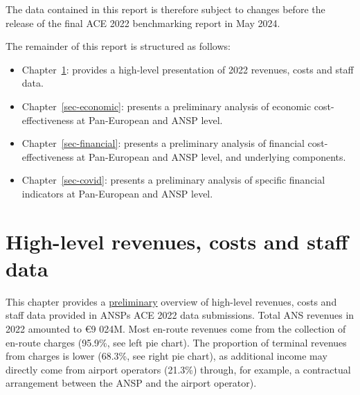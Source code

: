 \documentclass[
  letterpaper,
  DIV=11,
  numbers=noendperiod]{scrreprt}
\providecommand{\tightlist}{%
  \setlength{\itemsep}{0pt}\setlength{\parskip}{0pt}}\usepackage{longtable,booktabs,array}
\begin{document}
The data contained in this report is therefore subject to changes before
the release of the final ACE 2022 benchmarking report in May 2024.

The remainder of this report is structured as follows:

\begin{itemize}
\tightlist
\item
  Chapter~\ref{sec-high}: provides a high-level presentation of 2022
  revenues, costs and staff data.
\item
  Chapter~\ref{sec-economic}: presents a preliminary analysis of
  economic cost-effectiveness at Pan-European and ANSP level.
\item
  Chapter~\ref{sec-financial}: presents a preliminary analysis of
  financial cost-effectiveness at Pan-European and ANSP level, and
  underlying components.
\item
  Chapter~\ref{sec-covid}: presents a preliminary analysis of specific
  financial indicators at Pan-European and ANSP level.
\end{itemize}


\chapter{High-level revenues, costs and staff data}\label{sec-high}

This chapter provides a \ul{preliminary} overview of high-level
revenues, costs and staff data provided in ANSPs ACE 2022 data
submissions. Total ANS revenues in 2022 amounted to €9 024M. Most
en-route revenues come from the collection of en-route charges (95.9\%,
see left pie chart). The proportion of terminal revenues from charges is
lower (68.3\%, see right pie chart), as additional income may directly
come from airport operators (21.3\%) through, for example, a contractual
arrangement between the ANSP and the airport operator).
\end{document}
